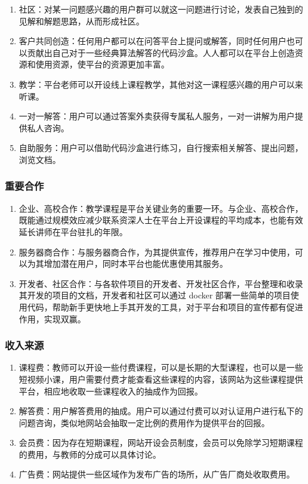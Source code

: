 \documentclass[a4paper]{ctexart}
\begin{document}
\begin{enumerate}[label=\alph*.]
  \item 社区：对某一问题感兴趣的用户群可以就这一问题进行讨论，发表自己独到的见解和解题思路，从而形成社区。
  \item 客户共同创造：任何用户都可以在问答平台上提问或解答，同时任何用户也可以贡献出自己对于一些经典算法解答的代码沙盒。人人都可以在平台上创造资源和使用资源，使平台的资源更加丰富。
  \item 教学：平台老师可以开设线上课程教学，其他对这一课程感兴趣的用户可以来听课。
  \item 一对一解答：用户可以通过答案外卖获得专属私人服务，一对一讲解为用户提供私人咨询。
  \item 自助服务：用户可以借助代码沙盒进行练习，自行搜索相关解答、提出问题，浏览文档。
\end{enumerate}

\subsubsection{重要合作}

\begin{enumerate}[label=\alph*.]
  \item 企业、高校合作：教学课程是平台关键业务的重要一环。与企业、高校合作，既能通过规模效应减少联系资深人士在平台上开设课程的平均成本，也能有效延长讲师在平台驻扎的年限。
  \item 服务器商合作：与服务器商合作，为其提供宣传，推荐用户在学习中使用，可以为其增加潜在用户，同时本平台也能优惠使用其服务。
  \item 开发者、社区合作：与各软件项目的开发者、开发社区合作，平台整理和收录其开发的项目的文档，开发者和社区可以通过 docker 部署一些简单的项目使用代码，帮助新手更快地上手其开发的工具，对于平台和项目的宣传都有促进作用，实现双赢。
\end{enumerate}

\subsubsection{收入来源}

\begin{enumerate}[label=\alph*.]
  \item 课程费：教师可以开设一些付费课程，可以是长期的大型课程，也可以是一些短视频小课，用户需要付费才能查看这些课程的内容，该网站为这些课程提供平台，相应地收取一些课程收入的抽成作为回报。
  \item 解答费：用户解答费用的抽成。用户可以通过付费可以对认证用户进行私下的问题咨询，类似地网站会抽取一定比例的费用作为提供平台的回报。
  \item 会员费：因为存在短期课程，网站开设会员制度，会员可以免除学习短期课程的费用，与教师的分成可以具体讨论。
  \item 广告费：网站提供一些区域作为发布广告的场所，从广告厂商处收取费用。
\end{enumerate}
\end{document}
